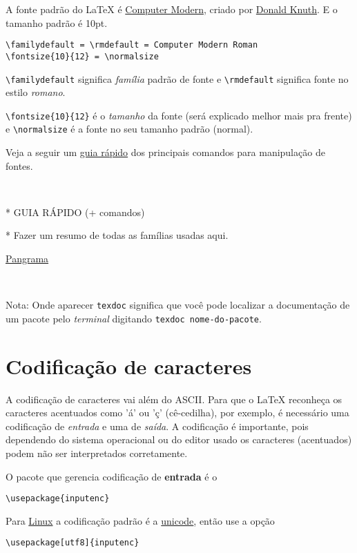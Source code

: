 \documentclass[a4paper]{report}
\renewcommand\familydefault{cmr}
\begin{document}
A fonte padrão do LaTeX é \href{http://en.wikipedia.org/wiki/Computer_Modern}{Computer Modern}, criado por \href{http://en.wikipedia.org/wiki/Donald_Knuth}{Donald Knuth}. E o tamanho padrão é 10pt.

\begin{verbatim}
\familydefault = \rmdefault = Computer Modern Roman
\fontsize{10}{12} = \normalsize
\end{verbatim}

\verb|\familydefault| significa \emph{família} padrão de fonte e \verb|\rmdefault| significa fonte no estilo \emph{romano}.

\verb|\fontsize{10}{12}| é o \emph{tamanho} da fonte (será explicado melhor mais pra frente) e \verb|\normalsize| é a fonte no seu tamanho padrão (normal).

Veja a seguir um \href{}{guia rápido} dos principais comandos para manipulação de fontes.

\

* GUIA RÁPIDO (+ comandos)

* Fazer um resumo de todas as famílias usadas aqui.

\href{http://pt.wikipedia.org/wiki/Pangrama}{Pangrama}

\

Nota: Onde aparecer \verb|texdoc| significa que você pode localizar a documentação de um pacote pelo \emph{terminal} digitando \verb|texdoc nome-do-pacote|.


\section{Codificação de caracteres}

A codificação de caracteres vai além do ASCII. Para que o LaTeX reconheça os caracteres acentuados como 'á' ou 'ç' (cê-cedilha), por exemplo, é necessário uma codificação de \emph{entrada} e uma de \emph{saída}. A codificação é importante, pois dependendo do sistema operacional ou do editor usado os caracteres (acentuados) podem não ser interpretados corretamente.

O pacote que gerencia codificação de \textbf{entrada} é o

\verb|\usepackage{inputenc}|

Para \href{http://latexbr.blogspot.com/2011/10/lancado-ubuntu-1110-oneiric-ocelot.html}{Linux} a codificação padrão é a \href{http://pt.wikipedia.org/wiki/Unicode}{unicode}, então use a opção

\verb|\usepackage[utf8]{inputenc}|
\end{document}
